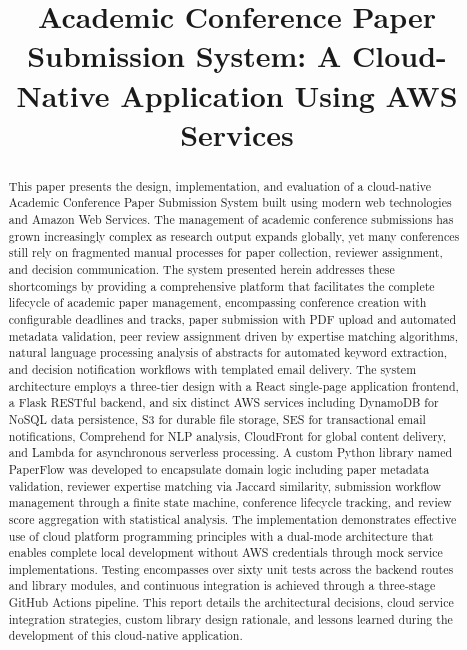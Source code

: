 \documentclass[conference]{IEEEtran}
\begin{document}
\title{Academic Conference Paper Submission System: A Cloud-Native Application Using AWS Services}

\author{
}

\maketitle

\begin{abstract}
This paper presents the design, implementation, and evaluation of a cloud-native Academic Conference Paper Submission System built using modern web technologies and Amazon Web Services. The management of academic conference submissions has grown increasingly complex as research output expands globally, yet many conferences still rely on fragmented manual processes for paper collection, reviewer assignment, and decision communication. The system presented herein addresses these shortcomings by providing a comprehensive platform that facilitates the complete lifecycle of academic paper management, encompassing conference creation with configurable deadlines and tracks, paper submission with PDF upload and automated metadata validation, peer review assignment driven by expertise matching algorithms, natural language processing analysis of abstracts for automated keyword extraction, and decision notification workflows with templated email delivery. The system architecture employs a three-tier design with a React single-page application frontend, a Flask RESTful backend, and six distinct AWS services including DynamoDB for NoSQL data persistence, S3 for durable file storage, SES for transactional email notifications, Comprehend for NLP analysis, CloudFront for global content delivery, and Lambda for asynchronous serverless processing. A custom Python library named PaperFlow was developed to encapsulate domain logic including paper metadata validation, reviewer expertise matching via Jaccard similarity, submission workflow management through a finite state machine, conference lifecycle tracking, and review score aggregation with statistical analysis. The implementation demonstrates effective use of cloud platform programming principles with a dual-mode architecture that enables complete local development without AWS credentials through mock service implementations. Testing encompasses over sixty unit tests across the backend routes and library modules, and continuous integration is achieved through a three-stage GitHub Actions pipeline. This report details the architectural decisions, cloud service integration strategies, custom library design rationale, and lessons learned during the development of this cloud-native application.
\end{abstract}
\end{document}
